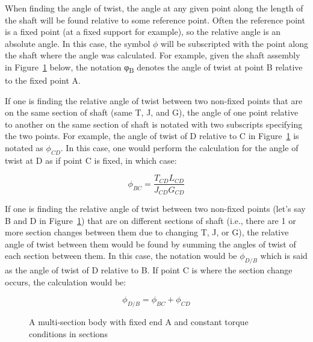 \documentclass[
  letterpaper,
  DIV=11,
  numbers=noendperiod]{scrreprt}
\theoremstyle{definition}
\theoremstyle{remark}
\begin{document}
When finding the angle of twist, the angle at any given point along the
length of the shaft will be found relative to some reference point.
Often the reference point is a fixed point (at a fixed support for
example), so the relative angle is an absolute angle. In this case, the
symbol \(\phi\) will be subscripted with the point along the shaft where
the angle was calculated. For example, given the shaft assembly in
Figure~\ref{fig-6.13} below, the notation φ\textsubscript{B} denotes the
angle of twist at point B relative to the fixed point A.

If one is finding the relative angle of twist between two non-fixed
points that are on the same section of shaft (same T, J, and G), the
angle of one point relative to another on the same section of shaft is
notated with two subscripts specifying the two points. For example, the
angle of twist of D relative to C in Figure~\ref{fig-6.13} is notated as
\(\phi_{CD}\). In this case, one would perform the calculation for the
angle of twist at D as if point C is fixed, in which case:

\[
\phi_{B C}=\frac{T_{C D} L_{C D}}{J_{C D} G_{C D}}
\]

If one is finding the relative angle of twist between two non-fixed
points (let's say B and D in Figure~\ref{fig-6.13}) that are on
different sections of shaft (i.e., there are 1 or more section changes
between them due to changing T, J, or G), the relative angle of twist
between them would be found by summing the angles of twist of each
section between them. In this case, the notation would be \(\phi_{D/B}\)
which is said as the angle of twist of D relative to B. If point C is
where the section change occurs, the calculation would be:

\[
\phi_{D / B}=\phi_{B C}+\phi_{C D}
\]

\begin{figure}


\caption{\label{fig-6.13}A multi-section body with fixed end A and
constant torque conditions in sections}

\end{figure}%
\end{document}
